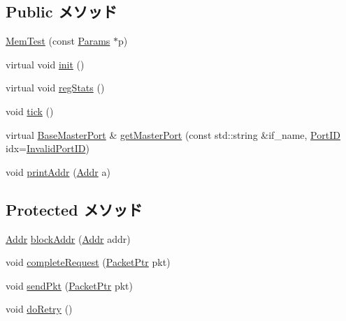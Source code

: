 \subsection*{Public メソッド}
\begin{DoxyCompactItemize}
\item 
\hyperlink{classMemTest_ae10fa702de4fca2792933a1386ca93a1}{MemTest} (const \hyperlink{classMemTest_a9c0e666eb773a0cfe77b832270b05c24}{Params} $\ast$p)
\item 
virtual void \hyperlink{classMemTest_a02fd73d861ef2e4aabb38c0c9ff82947}{init} ()
\item 
virtual void \hyperlink{classMemTest_a4dc637449366fcdfc4e764cdf12d9b11}{regStats} ()
\item 
void \hyperlink{classMemTest_a873dd91783f9efb4a590aded1f70d6b0}{tick} ()
\item 
virtual \hyperlink{classBaseMasterPort}{BaseMasterPort} \& \hyperlink{classMemTest_adc4e675e51defbdd1e354dac729d0703}{getMasterPort} (const std::string \&if\_\-name, \hyperlink{base_2types_8hh_acef4d7d41cb21fdc252e20c04cd7bb8e}{PortID} idx=\hyperlink{base_2types_8hh_a65bf40f138cf863f0c5e2d8ca1144126}{InvalidPortID})
\item 
void \hyperlink{classMemTest_a88aa41e2693dd0091afae2604eba9bed}{printAddr} (\hyperlink{base_2types_8hh_af1bb03d6a4ee096394a6749f0a169232}{Addr} a)
\end{DoxyCompactItemize}
\subsection*{Protected メソッド}
\begin{DoxyCompactItemize}
\item 
\hyperlink{base_2types_8hh_af1bb03d6a4ee096394a6749f0a169232}{Addr} \hyperlink{classMemTest_adb0890c3c50f747f06c26986a37a5f99}{blockAddr} (\hyperlink{base_2types_8hh_af1bb03d6a4ee096394a6749f0a169232}{Addr} addr)
\item 
void \hyperlink{classMemTest_afad8eceee562939262183ad20f806b82}{completeRequest} (\hyperlink{classPacket}{PacketPtr} pkt)
\item 
void \hyperlink{classMemTest_afd43ca83ca8c1d5fde8a2f349aa2cdc0}{sendPkt} (\hyperlink{classPacket}{PacketPtr} pkt)
\item 
void \hyperlink{classMemTest_a31440e5510a8c7bfc74e17363d813401}{doRetry} ()
\end{DoxyCompactItemize}

